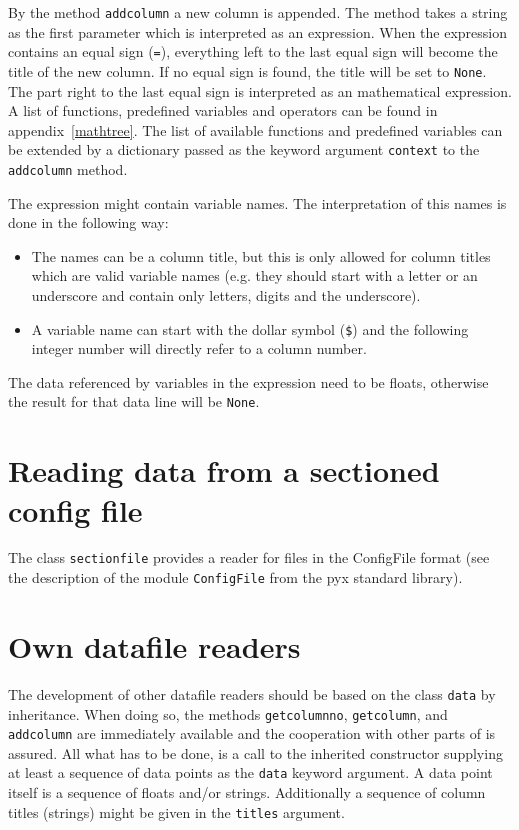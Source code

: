 By the method \verb|addcolumn| a new column is appended. The method
takes a string as the first parameter which is interpreted as an
expression. When the expression contains an equal sign (\verb|=|),
everything left to the last equal sign will become the title of the
new column. If no equal sign is found, the title will be set to
\verb|None|. The part right to the last equal sign is interpreted as
an mathematical expression. A list of functions, predefined variables
and operators can be found in appendix~\ref{mathtree}. The list of
available functions and predefined variables can be extended by a
dictionary passed as the keyword argument \verb|context| to the
\verb|addcolumn| method.

The expression might contain variable names. The interpretation of
this names is done in the following way:
\begin{itemize}
\item The names can be a column title, but this is only allowed for
column titles which are valid variable names (e.g. they should start
with a letter or an underscore and contain only letters, digits and
the underscore).
\item A variable name can start with the dollar symbol (\verb|$|) and
the following integer number will directly refer to a column number.
\end{itemize}
The data referenced by variables in the expression need to be
floats, otherwise the result for that data line will be \verb|None|.

\section{Reading data from a sectioned config file}

The class \verb|sectionfile| provides a reader for files in the
ConfigFile format (see the description of the module \verb|ConfigFile|
from the pyx standard library).

\section{Own datafile readers}

The development of other datafile readers should be based on the
class \verb|data| by inheritance. When doing so, the methods
\verb|getcolumnno|, \verb|getcolumn|, and \verb|addcolumn| are
immediately available and the cooperation with other parts of \PyX{}
is assured. All what has to be done, is a call to the inherited
constructor supplying at least a sequence of data points as the
\verb|data| keyword argument. A data point itself is a sequence of
floats and/or strings. Additionally a sequence of column titles
(strings) might be given in the \verb|titles| argument.
